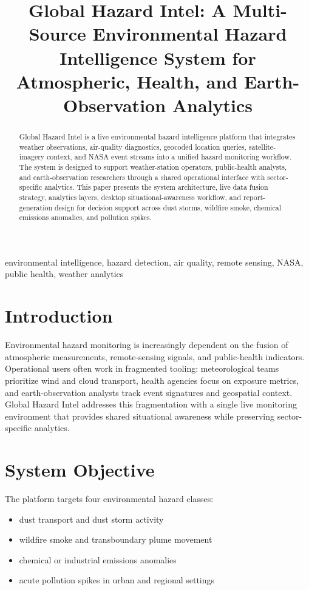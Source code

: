 \documentclass[conference]{IEEEtran}
\title{Global Hazard Intel: A Multi-Source Environmental Hazard Intelligence System for Atmospheric, Health, and Earth-Observation Analytics}
\author{
\IEEEauthorblockN{Brian Gill}
\IEEEauthorblockA{
BG Code Tech\\
Email: briang.gill@bgcode.tech
}
}
\begin{document}
\maketitle

\begin{abstract}
Global Hazard Intel is a live environmental hazard intelligence platform that integrates weather observations, air-quality diagnostics, geocoded location queries, satellite-imagery context, and NASA event streams into a unified hazard monitoring workflow. The system is designed to support weather-station operators, public-health analysts, and earth-observation researchers through a shared operational interface with sector-specific analytics. This paper presents the system architecture, live data fusion strategy, analytics layers, desktop situational-awareness workflow, and report-generation design for decision support across dust storms, wildfire smoke, chemical emissions anomalies, and pollution spikes.
\end{abstract}

\begin{IEEEkeywords}
environmental intelligence, hazard detection, air quality, remote sensing, NASA, public health, weather analytics
\end{IEEEkeywords}

\section{Introduction}
Environmental hazard monitoring is increasingly dependent on the fusion of atmospheric measurements, remote-sensing signals, and public-health indicators. Operational users often work in fragmented tooling: meteorological teams prioritize wind and cloud transport, health agencies focus on exposure metrics, and earth-observation analysts track event signatures and geospatial context. Global Hazard Intel addresses this fragmentation with a single live monitoring environment that provides shared situational awareness while preserving sector-specific analytics.

\section{System Objective}
The platform targets four environmental hazard classes:
\begin{itemize}
    \item dust transport and dust storm activity
    \item wildfire smoke and transboundary plume movement
    \item chemical or industrial emissions anomalies
    \item acute pollution spikes in urban and regional settings
\end{itemize}
\end{document}
